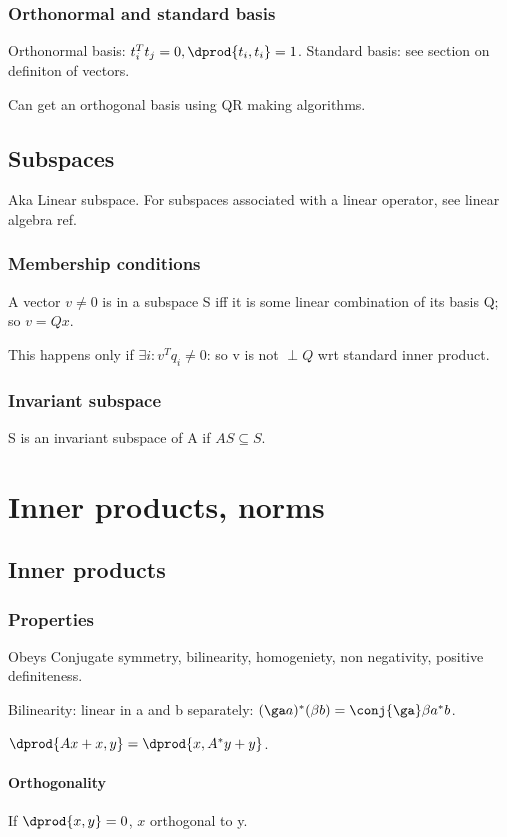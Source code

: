 \documentclass[oneside, article]{memoir}
\begin{document}
\subsection{Orthonormal and standard basis}
Orthonormal basis: $t_i^{T}t_j = 0, \dprod{t_i, t_i} = 1$. Standard basis: see section on definiton of vectors.

Can get an orthogonal basis using QR making algorithms.

\section{Subspaces}
Aka Linear subspace. For subspaces associated with a linear operator, see linear algebra ref.

\subsection{Membership conditions}
A vector $v\neq 0$ is in a subspace S iff it is some linear combination of its basis Q; so $v = Qx$.

This happens only if $\exists i: v^{T}q_i \neq 0$: so v is not $\perp Q$ wrt standard inner product.



\subsection{Invariant subspace}
S is an invariant subspace of A if $AS \subseteq S$.

\chapter{Inner products, norms}
\section{Inner products}
\subsection{Properties}
Obeys Conjugate symmetry, bilinearity, homogeniety, non negativity, positive definiteness.

Bilinearity: linear in a and b separately: $(\ga a)^{*}(\beta b) = \conj{\ga}\beta a^{*}b$. 

$\dprod{Ax + x, y} = \dprod{x, A^{*}y + y}$.

\subsubsection{Orthogonality}
If $\dprod{x, y} = 0$, $x$ orthogonal to y.
\end{document}
